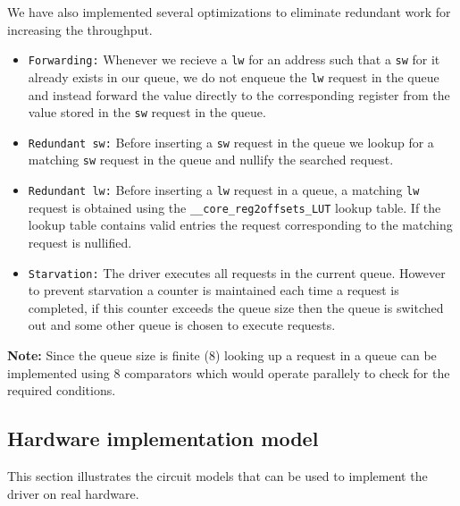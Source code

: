 \documentclass[hidelinks,12pt]{article}
\begin{document}
We have also implemented several optimizations to eliminate redundant work for increasing the throughput.

\begin{itemize}
    \item \verb|Forwarding:| Whenever we recieve a \verb|lw| for an address such that a \verb|sw| for it already exists in our queue, we do not enqueue the \verb|lw| request in the queue and instead forward the value directly to the corresponding register
          from the value stored in the \verb|sw| request in the queue.
    \item \verb|Redundant sw:| Before inserting a \verb|sw| request in the queue we lookup for a matching \verb|sw| request in the queue and nullify the searched request.
    \item \verb|Redundant lw:| Before inserting a \verb|lw| request in a queue, a matching \verb|lw| request is obtained using the \verb|__core_reg2offsets_LUT| lookup table.
          If the lookup table contains valid entries the request corresponding to the matching request is nullified.
    \item \verb|Starvation:| The driver executes all requests in the current queue. However to prevent starvation a counter is maintained each time a request is completed,
          if this counter exceeds the queue size then the queue is switched out and some other queue is chosen to execute requests.
\end{itemize}

\textbf{Note:} Since the queue size is finite ($8$) looking up a request in a queue can be implemented using $8$ comparators which would operate parallely to check for the required conditions.

\subsection{Hardware implementation model}
This section illustrates the circuit models that can be used to implement the driver on real hardware.
\end{document}
